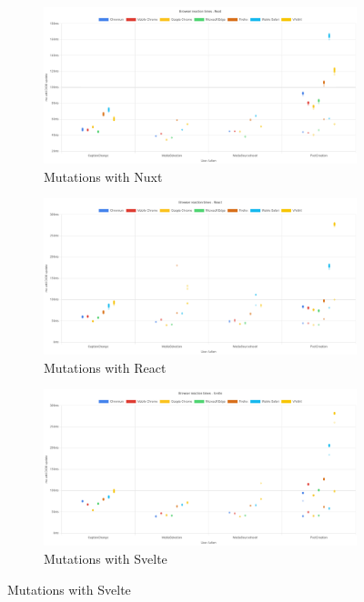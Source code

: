 \documentclass[a4paper, 10pt]{article}
\begin{document}
\begin{figure}[ht!]\ContinuedFloat
  \begin{subfigure}{0.9\linewidth}
    \begin{center}
      \includegraphics[width=\linewidth, keepaspectratio]{img/playwright-results/framework/Nuxt.png}
    \end{center}
    \caption{Mutations with Nuxt}\label{subfig:PW:Nuxt}
  \end{subfigure}
  \begin{subfigure}{0.9\linewidth}
    \begin{center}
      \includegraphics[width=\linewidth, keepaspectratio]{img/playwright-results/framework/React.png}
    \end{center}
    \caption{Mutations with React}\label{subfig:PW:React}
  \end{subfigure}
  \begin{subfigure}{0.9\linewidth}
    \begin{center}
      \includegraphics[width=\linewidth, keepaspectratio]{img/playwright-results/framework/Svelte.png}
    \end{center}
    \caption{Mutations with Svelte}\label{subfig:PW:Svelte}
  \end{subfigure}
\end{figure}
\end{document}
